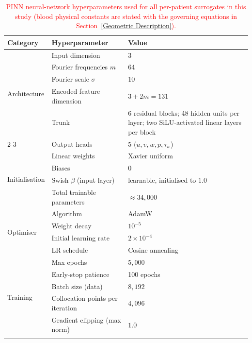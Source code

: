 ﻿\documentclass[12pt,a4paper]{article}
\theoremstyle{definition}
\numberwithin{equation}{section}
\begin{document}
\begin{table}[H]
\color{red}%
\centering
\setlength{\tabcolsep}{4pt}
\renewcommand{\arraystretch}{1.1}
\caption{\textcolor{red}{PINN neural-network hyperparameters used for all per-patient surrogates in this study (blood physical constants are stated with the governing equations in Section~\ref{Geometric Description}).}}
\label{tab:pinn_hyperparams}
\begin{tabular}{|l|p{4.6cm}|p{6.6cm}|}
\hline
\textbf{Category} & \textbf{Hyperparameter} & \textbf{Value} \\ \hline
\multirow{5}{*}{Architecture}
 & Input dimension & 3 \\ \cline{2-3}
 & Fourier frequencies $m$ & 64 \\ \cline{2-3}
 & Fourier scale $\sigma$ & 10 \\ \cline{2-3}
 & Encoded feature dimension & $3 + 2m = 131$ \\ \cline{2-3}
 & Trunk & 6 residual blocks; 48 hidden units per layer; two SiLU-activated linear layers per block \\ \cline{2-3}
 & Output heads & 5 ($u, v, w, p, \tau_w$) \\ \hline
\multirow{4}{*}{Initialisation}
 & Linear weights & Xavier uniform \\ \cline{2-3}
 & Biases & $0$ \\ \cline{2-3}
 & Swish $\beta$ (input layer) & learnable, initialised to $1.0$ \\ \cline{2-3}
 & Total trainable parameters & $\approx 34{,}000$ \\ \hline
\multirow{4}{*}{Optimiser}
 & Algorithm & AdamW \\ \cline{2-3}
 & Weight decay & $10^{-5}$ \\ \cline{2-3}
 & Initial learning rate & $2 \times 10^{-4}$ \\ \cline{2-3}
 & LR schedule & Cosine annealing \\ \hline
\multirow{6}{*}{Training}
 & Max epochs & $5{,}000$ \\ \cline{2-3}
 & Early-stop patience & 100 epochs \\ \cline{2-3}
 & Batch size (data) & $8{,}192$ \\ \cline{2-3}
 & Collocation points per iteration & $4{,}096$ \\ \cline{2-3}
 & Gradient clipping (max norm) & $1.0$ \\ \cline{2-3}

\end{tabular}
\end{table}
\end{document}
